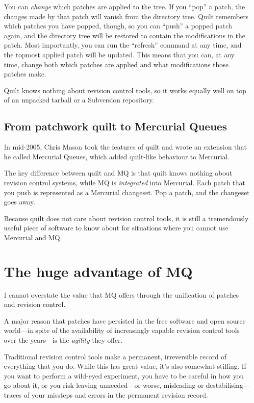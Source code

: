 You can \emph{change} which patches are applied to the tree.  If you
``pop'' a patch, the changes made by that patch will vanish from the
directory tree.  Quilt remembers which patches you have popped,
though, so you can ``push'' a popped patch again, and the directory
tree will be restored to contain the modifications in the patch.  Most
importantly, you can run the ``refresh'' command at any time, and the
topmost applied patch will be updated.  This means that you can, at
any time, change both which patches are applied and what
modifications those patches make.

Quilt knows nothing about revision control tools, so it works equally
well on top of an unpacked tarball or a Subversion repository.

\subsection{From patchwork quilt to Mercurial Queues}
\label{sec:mq:quilt-mq}

In mid-2005, Chris Mason took the features of quilt and wrote an
extension that he called Mercurial Queues, which added quilt-like
behaviour to Mercurial.

The key difference between quilt and MQ is that quilt knows nothing
about revision control systems, while MQ is \emph{integrated} into
Mercurial.  Each patch that you push is represented as a Mercurial
changeset.  Pop a patch, and the changeset goes away.

Because quilt does not care about revision control tools, it is still
a tremendously useful piece of software to know about for situations
where you cannot use Mercurial and MQ.

\section{The huge advantage of MQ}

I cannot overstate the value that MQ offers through the unification of
patches and revision control.

A major reason that patches have persisted in the free software and
open source world---in spite of the availability of increasingly
capable revision control tools over the years---is the \emph{agility}
they offer.  

Traditional revision control tools make a permanent, irreversible
record of everything that you do.  While this has great value, it's
also somewhat stifling.  If you want to perform a wild-eyed
experiment, you have to be careful in how you go about it, or you risk
leaving unneeded---or worse, misleading or destabilising---traces of
your missteps and errors in the permanent revision record.

